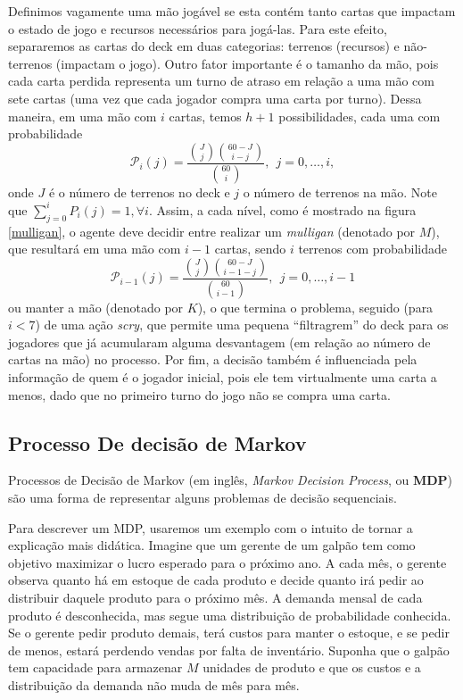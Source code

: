 \documentclass{book}
\begin{document}
Definimos vagamente uma mão jogável se esta contém tanto cartas que
impactam o estado de jogo e recursos necessários para jogá-las.
Para este efeito, separaremos as cartas do deck em duas categorias:
terrenos (recursos) e não-terrenos (impactam o jogo).
Outro fator importante é o tamanho da mão, pois cada carta perdida
representa um turno de atraso em relação a uma mão com sete cartas (uma
vez que cada jogador compra
uma carta por turno). Dessa maneira, em uma mão com $i$ cartas, temos
$h+1$ possibilidades, cada uma com probabilidade
\begin{equation} \label{eq:stateprob} \mathcal{P}_i(j) =
\frac{\binom{J}{j}\binom{60 - J}{i - j}}{\binom{60}{i}}, \ \
j = 0,\ldots, i, \end{equation} onde $J$ é o número de terrenos no deck
e $j$ o
número de terrenos
na mão. Note que $\sum_{j=0}^{i}P_i(j) = 1, \forall i$. Assim, a cada nível, como é mostrado na figura \ref{mulligan}, o
agente deve decidir entre realizar um \textit{mulligan}
(denotado por $M$), que resultará em uma mão com $i-1$ cartas, sendo $i$
terrenos com probabilidade
 \[ \mathcal{P}_{i - 1}(j) = \frac{\binom{J}{j}\binom{60 - J}{i - 1 -
j}}{\binom{60}{i - 1}}, \ \  j = 0,\ldots, i - 1\]
 ou manter a mão (denotado por $K$), o que termina o problema, seguido
(para $i < 7$) de uma ação \textit{scry}, que permite uma pequena
``filtragrem''
 do deck para os jogadores que já acumularam alguma desvantagem (em
relação ao número de cartas na mão) no processo. Por fim, a decisão
também é influenciada
 pela informação de quem é o jogador inicial, pois ele tem virtualmente
uma carta a menos, dado que no primeiro turno do jogo não se compra uma
carta.

\pagebreak
\subsection{Processo De decisão de Markov}
\label{ssec:mdp}

Processos de Decisão de Markov (em inglês, \textit{Markov Decision Process}, ou \textbf{MDP})
são uma forma de representar alguns problemas de decisão sequenciais.

Para descrever um MDP, usaremos um exemplo com o intuito de tornar a explicação mais didática.
Imagine que um gerente de um galpão tem como objetivo maximizar o lucro esperado para o próximo
ano. A cada mês, o gerente observa quanto há em estoque de cada produto e decide quanto irá pedir
ao distribuir daquele produto para o próximo mês. A demanda mensal de cada produto é desconhecida,
mas segue uma distribuição de probabilidade conhecida. Se o gerente pedir produto demais, terá
custos para manter o estoque, e se pedir de menos, estará perdendo vendas por falta de inventário.
Suponha que o galpão tem capacidade para armazenar $M$ unidades de produto e que os custos e a
distribuição da demanda não muda de mês para mês.
\end{document}
